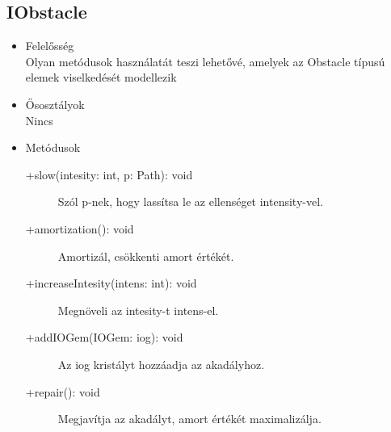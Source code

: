 \subsection{IObstacle}
\begin{itemize}
\item Felelősség\\
Olyan metódusok használatát teszi lehetővé, amelyek az Obstacle típusú elemek viselkedését modellezik
\item Ősosztályok\\
Nincs

\item Metódusok
	\begin{description}
		\item[+slow(intesity: int, p: Path): void] Szól p-nek, hogy lassítsa le az ellenséget intensity-vel. 
\item[+amortization(): void] Amortizál, csökkenti amort értékét. 
\item[+increaseIntesity(intens: int): void] Megnöveli az intesity-t intens-el. 
\item[+addIOGem(IOGem: iog): void] Az iog kristályt hozzáadja az akadályhoz. 
\item[+repair(): void] Megjavítja az akadályt, amort értékét maximalizálja. 



		
		
	\end{description}
\end{itemize}
